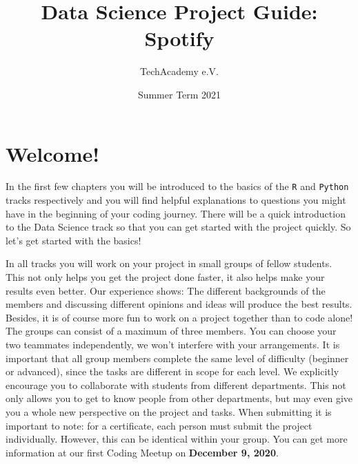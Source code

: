 \documentclass[
  11pt,
]{book}
\title{Data Science Project Guide: Spotify}
\author{TechAcademy e.V.}
\date{Summer Term 2021}
\begin{document}
\frontmatter
\maketitle

\mainmatter
\clearpage

\addtolength{\headheight}{17.82275pt}

\fancyfoot{}
\fancyfoot[R]{\thepage}
\addtolength{\headheight}{17.82275pt}


\renewcommand{\headrulewidth}{0.25pt}
\renewcommand{\footrulewidth}{0.25pt}

\tableofcontents
\clearpage

\hypertarget{welcome}{%
\chapter{Welcome!}\label{welcome}}

In the first few chapters you will be introduced to the basics of the
\texttt{R} and \texttt{Python} tracks respectively and you will find
helpful explanations to questions you might have in the beginning of
your coding journey. There will be a quick introduction to the Data
Science track so that you can get started with the project quickly. So
let's get started with the basics!

In all tracks you will work on your project in small groups of fellow
students. This not only helps you get the project done faster, it also
helps make your results even better. Our experience shows: The different
backgrounds of the members and discussing different opinions and ideas
will produce the best results. Besides, it is of course more fun to work
on a project together than to code alone!\\
The groups can consist of a maximum of three members. You can choose
your two teammates independently, we won't interfere with your
arrangements. It is important that all group members complete the same
level of difficulty (beginner or advanced), since the tasks are
different in scope for each level. We explicitly encourage you to
collaborate with students from different departments. This not only
allows you to get to know people from other departments, but may even
give you a whole new perspective on the project and tasks. When
submitting it is important to note: for a certificate, each person must
submit the project individually. However, this can be identical within
your group. You can get more information at our first Coding Meetup on
\textbf{December 9, 2020}.
\end{document}
